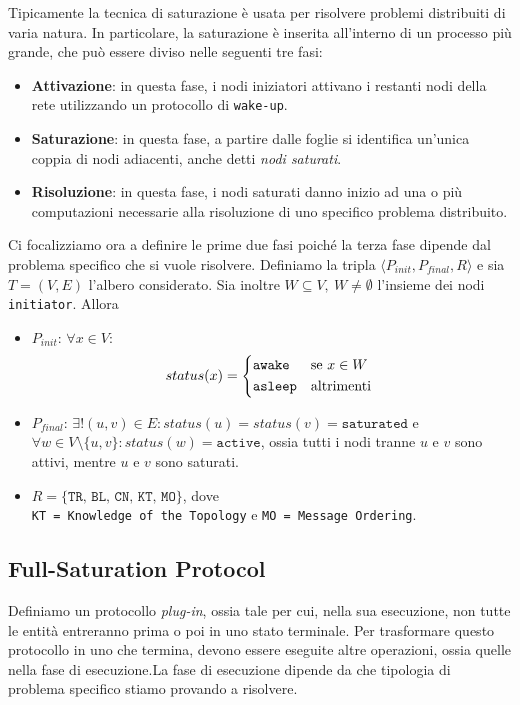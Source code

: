 Tipicamente la tecnica di saturazione è usata per risolvere problemi distribuiti di varia natura. In particolare, la saturazione è inserita all'interno di un processo più grande, che può essere diviso nelle seguenti tre fasi:
\begin{itemize}
    \item \textbf{Attivazione}: in questa fase, i nodi iniziatori attivano i restanti nodi della rete utilizzando un protocollo di \texttt{wake-up}.
    \item \textbf{Saturazione}: in questa fase, a partire dalle foglie si identifica un'unica coppia di nodi adiacenti, anche detti \textit{nodi saturati}.
    \item \textbf{Risoluzione}: in questa fase, i nodi saturati danno inizio ad una o più computazioni necessarie alla risoluzione di uno specifico problema distribuito.
\end{itemize}

Ci focalizziamo ora a definire le prime due fasi poiché la terza fase dipende dal problema specifico che si vuole risolvere. Definiamo la tripla $\langle P_{init}, P_{final}, R\rangle$ e sia $T = (V, E)$ l'albero considerato. Sia inoltre $W \subseteq V,\ W \neq \emptyset$ l'insieme dei nodi \texttt{initiator}. Allora
\begin{itemize}
    \item $P_{init}$: $\forall x \in V:$
    \[
        status(x) = \begin{cases*}
            \texttt{awake} & se $x \in W$\\
            \texttt{asleep} & altrimenti
        \end{cases*}
    \]
    \item $P_{final}$: $\exists! (u, v) \in E: status(u) = status(v) = \texttt{saturated}$ e $\forall w \in V\setminus\{u, v\}: status(w) = \texttt{active}$, ossia tutti i nodi tranne $u$ e $v$ sono attivi, mentre $u$ e $v$ sono saturati.
    \item $R = \{\texttt{TR, BL, CN, KT, MO}\}$, dove \\ \texttt{KT = Knowledge of the Topology} e \texttt{MO = Message Ordering}.
\end{itemize}

\subsection{Full-Saturation Protocol}

Definiamo un protocollo \textit{plug-in}, ossia tale per cui, nella sua esecuzione, non tutte le entità entreranno prima o poi in uno stato terminale. Per trasformare questo protocollo in uno che termina, devono essere eseguite altre operazioni, ossia quelle nella fase di esecuzione.La fase di esecuzione dipende da che tipologia di problema specifico stiamo provando a risolvere.

